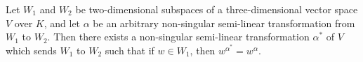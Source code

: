 Let $W_1$ and $W_2$ be two-dimensional subspaces of a three-dimensional vector space $V$ over $K$, and let $\alpha$ be an arbitrary non-singular semi-linear transformation from $W_1$ to $W_2$. Then there exists a non-singular semi-linear transformation $\alpha^*$ of $V$ which sends $W_1$ to $W_2$ such that if $w \in W_1$, then $w^{\alpha^*} = w^\alpha$.

